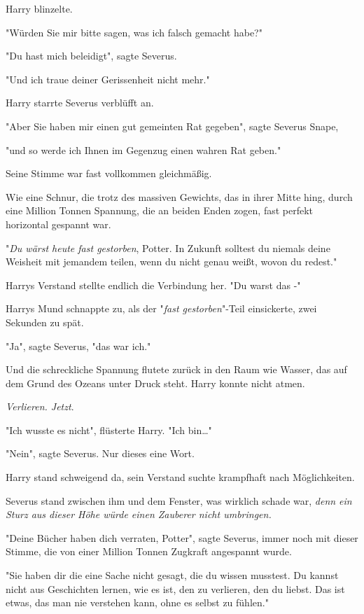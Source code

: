 {Harry blinzelte.

"Würden Sie mir bitte sagen, was ich falsch gemacht habe?"

"Du hast mich beleidigt", sagte Severus.

"Und ich traue deiner Gerissenheit nicht mehr."

Harry starrte Severus verblüfft an.

"Aber Sie haben mir einen gut gemeinten Rat gegeben", sagte Severus Snape,

"und so werde ich Ihnen im Gegenzug einen wahren Rat geben."

Seine Stimme war fast vollkommen gleichmäßig.

Wie eine Schnur, die trotz des massiven Gewichts, das in ihrer Mitte hing, durch eine Million Tonnen Spannung, die an beiden Enden zogen, fast perfekt horizontal gespannt war.

"\emph{Du wärst heute fast gestorben}, Potter. In Zukunft solltest du niemals deine Weisheit mit jemandem teilen, wenn du nicht genau weißt, wovon du redest."

Harrys Verstand stellte endlich die Verbindung her. "Du warst das -"

Harrys Mund schnappte zu, als der "\emph{fast gestorben}"-Teil einsickerte, zwei Sekunden zu spät.

"Ja", sagte Severus, "das war ich."

Und die schreckliche Spannung flutete zurück in den Raum wie Wasser, das auf dem Grund des Ozeans unter Druck steht. Harry konnte nicht atmen.

\emph{Verlieren. Jetzt}.

"Ich wusste es nicht", flüsterte Harry. "Ich bin…"

"Nein", sagte Severus. Nur dieses eine Wort.

Harry stand schweigend da, sein Verstand suchte krampfhaft nach Möglichkeiten.

Severus stand zwischen ihm und dem Fenster, was wirklich schade war, \emph{denn ein Sturz aus dieser Höhe würde einen Zauberer nicht umbringen.}

"Deine Bücher haben dich verraten, Potter", sagte Severus, immer noch mit dieser Stimme, die von einer Million Tonnen Zugkraft angespannt wurde.

"Sie haben dir die eine Sache nicht gesagt, die du wissen musstest. Du kannst nicht aus Geschichten lernen, wie es ist, den zu verlieren, den du liebst. Das ist etwas, das man nie verstehen kann, ohne es selbst zu fühlen."

}
